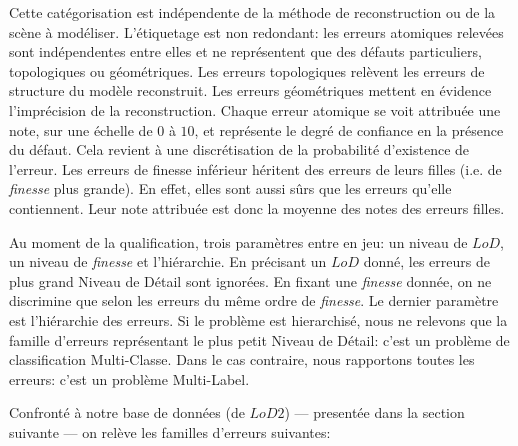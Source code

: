 \documentclass[a4paper,french]{article}
\begin{document}
    Cette catégorisation est indépendente de la méthode de reconstruction ou de la scène à modéliser. L'étiquetage est non redondant: les erreurs atomiques relevées sont indépendentes entre elles et ne représentent que des défauts particuliers, topologiques ou géométriques. Les erreurs topologiques relèvent les erreurs de structure du modèle reconstruit. Les erreurs géométriques mettent en évidence l'imprécision de la reconstruction. Chaque erreur atomique se voit attribuée une note, sur une échelle de $0$ à $10$, et représente le degré de confiance en la présence du défaut. Cela revient à une discrétisation de la probabilité d'existence de l'erreur. Les erreurs de finesse inférieur héritent des erreurs de leurs filles (i.e. de \emph{finesse} plus grande). En effet, elles sont aussi sûrs que les erreurs qu'elle contiennent. Leur note attribuée est donc la moyenne des notes des erreurs filles.

    Au moment de la qualification, trois paramètres entre en jeu: un niveau de $LoD$, un niveau de \emph{finesse} et l'hiérarchie. En précisant un $LoD$ donné, les erreurs de plus grand Niveau de Détail sont ignorées. En fixant une \emph{finesse} donnée, on ne discrimine que selon les erreurs du même ordre de \emph{finesse}. Le dernier paramètre est l'hiérarchie des erreurs. Si le problème est hierarchisé, nous ne relevons que la famille d'erreurs représentant le plus petit Niveau de Détail: c'est un problème de classification Multi-Classe. Dans le cas contraire, nous rapportons toutes les erreurs: c'est un problème Multi-Label.

    Confronté à notre base de données (de $LoD 2$) --- presentée dans la section suivante --- on relève les familles d'erreurs suivantes:
\end{document}
